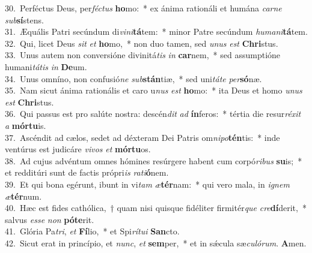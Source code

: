 {30.~}Perféctus Deus, per\textit{fé}\textit{ctus} \textbf{ho}mo:~* ex ánima rationáli et humána \textit{car}\textit{ne} \textit{sub}\textbf{sí}stens.\\
{31.~}Æquális Patri secúndum di\textit{vi}\textit{ni}\textbf{tá}tem:~* minor Patre secúndum \textit{hu}\textit{ma}\textit{ni}\textbf{tá}tem.\\
{32.~}Qui, licet Deus \textit{sit} \textit{et} \textbf{ho}mo,~* non duo tamen, sed \textit{u}\textit{nus} \textit{est} \textbf{Chri}stus.\\
{33.~}Unus autem non conversióne divinitá\textit{tis} \textit{in} \textbf{car}nem,~* sed assumptióne humani\textit{tá}\textit{tis} \textit{in} \textbf{De}um.\\
{34.~}Unus omníno, non confusió\textit{ne} \textit{sub}\textbf{stán}tiæ,~* sed uni\textit{tá}\textit{te} \textit{per}\textbf{só}næ.\\
{35.~}Nam sicut ánima rationális et caro u\textit{nus} \textit{est} \textbf{ho}mo:~* ita Deus et homo \textit{u}\textit{nus} \textit{est} \textbf{Chri}stus.\\
{36.~}Qui passus est pro salúte nostra: descén\textit{dit} \textit{ad} \textbf{ín}feros:~* tértia die resur\textit{ré}\textit{xit} \textit{a} \textbf{mór}\textbf{tu}is.\\
{37.~}Ascéndit ad cælos, sedet ad déxteram Dei Patris om\textit{ni}\textit{po}\textbf{tén}tis:~* inde ventúrus est judicáre \textit{vi}\textit{vos} \textit{et} \textbf{mór}\textbf{tu}os.\\
{38.~}Ad cujus advéntum omnes hómines resúrgere habent cum corpó\textit{ri}\textit{bus} \textbf{su}is;~* et redditúri sunt de factis própri\textit{is} \textit{ra}\textit{ti}\textbf{ó}nem.\\
{39.~}Et qui bona egérunt, ibunt in vi\textit{tam} \textit{æ}\textbf{tér}nam:~* qui vero mala, in \textit{i}\textit{gnem} \textit{æ}\textbf{tér}num.\\
{40.~}Hæc est fides cathólica,~† quam nisi quisque fidéliter firmitér\textit{que} \textit{cre}\textbf{dí}derit,~* salvus \textit{es}\textit{se} \textit{non} \textbf{pó}\textbf{te}rit.\\
{41.~}Glória Pa\textit{tri}, \textit{et} \textbf{Fí}lio,~* et Spi\textit{rí}\textit{tu}\textit{i} \textbf{San}cto.\\
{42.~}Sicut erat in princípio, et \textit{nunc}, \textit{et} \textbf{sem}per,~* et in sǽcula sæ\textit{cu}\textit{ló}\textit{rum}. \textbf{A}men.\\

